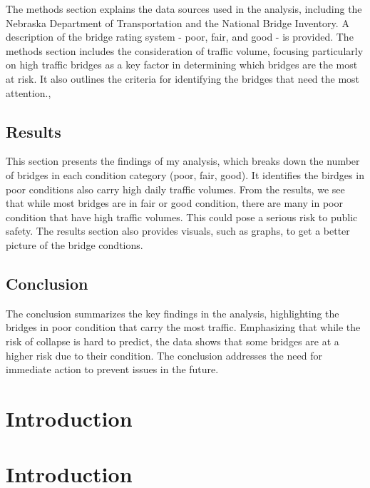 \documentclass[
  letterpaper,
  DIV=11,
  numbers=noendperiod]{scrreprt}
\begin{document}
The methods section explains the data sources used in the analysis,
including the Nebraska Department of Transportation and the National
Bridge Inventory. A description of the bridge rating system - poor,
fair, and good - is provided. The methods section includes the
consideration of traffic volume, focusing particularly on high traffic
bridges as a key factor in determining which bridges are the most at
risk. It also outlines the criteria for identifying the bridges that
need the most attention.,

\section{Results}\label{results}

This section presents the findings of my analysis, which breaks down the
number of bridges in each condition category (poor, fair, good). It
identifies the birdges in poor conditions also carry high daily traffic
volumes. From the results, we see that while most bridges are in fair or
good condition, there are many in poor condition that have high traffic
volumes. This could pose a serious risk to public safety. The results
section also provides visuals, such as graphs, to get a better picture
of the bridge condtions.

\section{Conclusion}\label{conclusion}

The conclusion summarizes the key findings in the analysis, highlighting
the bridges in poor condition that carry the most traffic. Emphasizing
that while the risk of collapse is hard to predict, the data shows that
some bridges are at a higher risk due to their condition. The conclusion
addresses the need for immediate action to prevent issues in the future.


\chapter{Introduction}\label{introduction}


\chapter{Introduction}\label{introduction-1}
\end{document}
